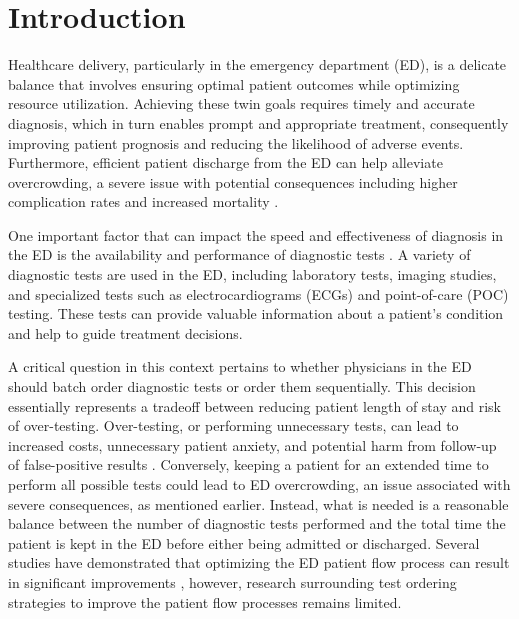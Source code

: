 \documentclass[,,nonblindrev]{informs}
\begin{document}

\maketitle


\hypertarget{sec:1}{%
\section{Introduction}\label{sec:1}}

Healthcare delivery, particularly in the emergency department (ED), is a
delicate balance that involves ensuring optimal patient outcomes while
optimizing resource utilization. Achieving these twin goals requires
timely and accurate diagnosis, which in turn enables prompt and
appropriate treatment, consequently improving patient prognosis and
reducing the likelihood of adverse events. Furthermore, efficient
patient discharge from the ED can help alleviate overcrowding, a severe
issue with potential consequences including higher complication rates
and increased mortality \citet{bernstein2009}.

One important factor that can impact the speed and effectiveness of
diagnosis in the ED is the availability and performance of diagnostic
tests \citet{naseim2015}. A variety of diagnostic tests are used in the
ED, including laboratory tests, imaging studies, and specialized tests
such as electrocardiograms (ECGs) and point-of-care (POC) testing. These
tests can provide valuable information about a patient's condition and
help to guide treatment decisions.

A critical question in this context pertains to whether physicians in
the ED should batch order diagnostic tests or order them sequentially.
This decision essentially represents a tradeoff between reducing patient
length of stay and risk of over-testing. Over-testing, or performing
unnecessary tests, can lead to increased costs, unnecessary patient
anxiety, and potential harm from follow-up of false-positive results
\citet{koch2018}. Conversely, keeping a patient for an extended time to
perform all possible tests could lead to ED overcrowding, an issue
associated with severe consequences, as mentioned earlier. Instead, what
is needed is a reasonable balance between the number of diagnostic tests
performed and the total time the patient is kept in the ED before either
being admitted or discharged. Several studies have demonstrated that
optimizing the ED patient flow process can result in significant
improvements \citet{saghafian2015}, however, research surrounding test
ordering strategies to improve the patient flow processes remains
limited.
\end{document}
